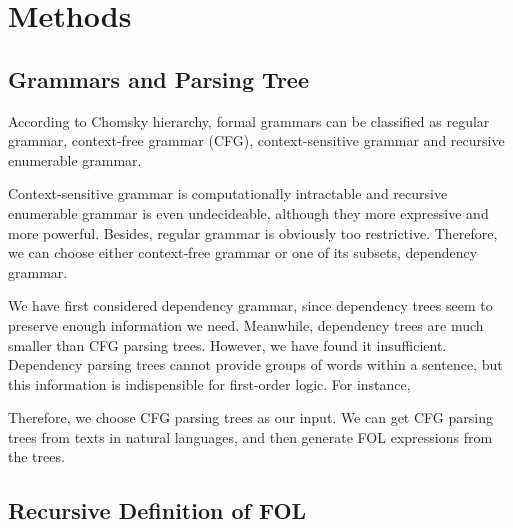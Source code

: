\documentclass{article}
\begin{document}
\section{Methods}{
	\subsection{Grammars and Parsing Tree}{
		\cite{su}

		According to Chomsky hierarchy, formal grammars can be classified as regular grammar, context-free grammar (CFG), context-sensitive grammar and recursive enumerable grammar. 

		Context-sensitive grammar is computationally intractable and recursive enumerable grammar is even undecideable, although they more expressive and more powerful. Besides, regular grammar is obviously too restrictive. Therefore, we can choose either context-free grammar or one of its subsets, dependency grammar. 

		We have first considered dependency grammar, since dependency trees seem to preserve enough information we need. Meanwhile, dependency trees are much smaller than CFG parsing trees. However, we have found it insufficient. Dependency parsing trees cannot provide groups of words within a sentence, but this information is indispensible for first-order logic. For instance, 

		Therefore, we choose CFG parsing trees as our input. We can get CFG parsing trees from texts in natural languages, and then generate FOL expressions from the trees. 
	}

	\subsection{Recursive Definition of FOL}{





}}
\end{document}
